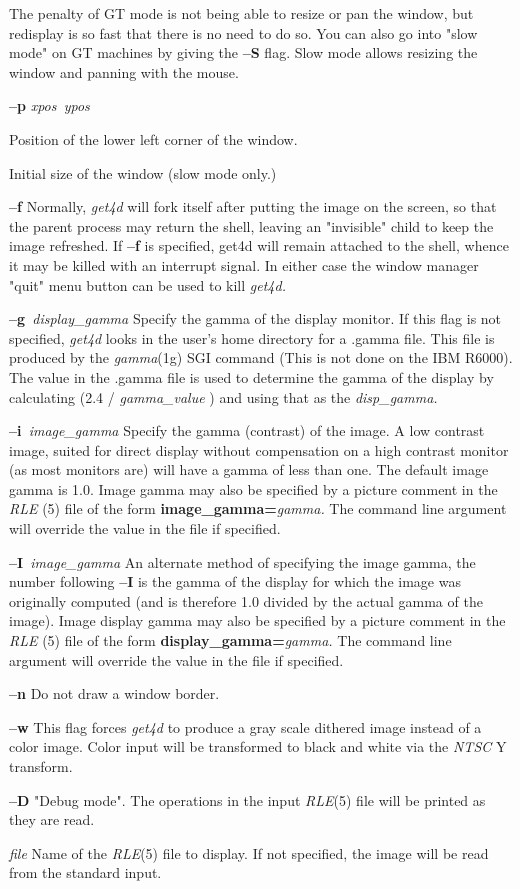The penalty of GT mode is not being able to resize or pan the window, but
redisplay is so fast that there is no need to do so.  You can also go into
"slow mode" on GT machines by giving the
{\bf --S}
flag.  Slow mode allows resizing the window and panning with the mouse.
\begin{TPlist}{{\bf %
\bf --p} %
\it xpos\ ypos%
\rm }
\item[{{\bf %
\bf --p} %
\it xpos\ ypos%
\rm }]
Position of the lower left corner of the window.
\item[{{\bf %
\bf --s} %
\it xsize\ ysize%
\rm }]
Initial size of the window (slow mode only.)
\item[{{\bf --f}}]
Normally,
{\it get4d}
will fork itself after putting the image on the screen, so that the
parent process may return the shell, leaving an "invisible" child to
keep the image refreshed.  If 
{\bf --f}
is specified, get4d will remain attached to the shell, whence it may be killed
with an interrupt signal.  In either case the window manager "quit" menu
button can be used to kill 
{\it get4d.}
\item[{{\bf --g}{\it \ display\_gamma}
}]
Specify the gamma of the display monitor.  If this flag is not specified,
{\it get4d}
looks in the user's home directory for a .gamma file.  This file is 
produced by the
{\it gamma}{\rm (1g)}
SGI command (This is not done on the IBM R6000).  The value in the .gamma
file is used to determine the gamma of the display by calculating (2.4 /
{\it gamma\_value}
) and using that as the 
{\it disp\_gamma.}
\item[{{\bf --i}{\it \ image\_gamma}
}]
Specify the gamma (contrast) of the image.  A low contrast image,
suited for direct display without compensation on a high contrast
monitor (as most monitors are) will have a gamma of less than one.
The default image gamma is 1.0.  Image gamma may also be specified by
a picture comment in the
{\it RLE} (5)
file of the form
{\bf image\_gamma=}{\it gamma.}
The command line argument will override the value in the file if specified.
\item[{{\bf --I}{\it \ image\_gamma}
}]
An alternate method of specifying the image gamma, the number
following
{\bf --I}
is the gamma of the display for which the image was originally
computed (and is therefore 1.0 divided by the actual gamma of the
image).  Image display gamma may also be specified by
a picture comment in the
{\it RLE} (5)
file of the form
{\bf display\_gamma=}{\it gamma.}
The command line argument will override the value in the file if specified.
\item[{{\bf --n}}]
Do not draw a window border.
\item[{{\bf --w}}]
This flag forces
{\it get4d}
to produce a gray scale dithered image instead of a color image.
Color input will be transformed to black and white via the
{\it NTSC} Y
transform.
\item[{{\bf --D}}]
"Debug mode".  The operations in the input
{\it RLE}{\rm (5)}
file will be printed as they are read.
\item[{{\it file}}]
Name of the
{\it RLE}{\rm (5)}
file to display.  If not specified, the image will be read from the
standard input.
\end{TPlist}\par\noindent
